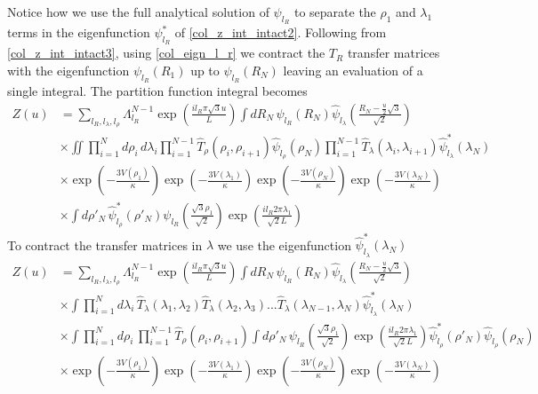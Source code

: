 %
Notice how we use the full analytical solution of $\psi_{l_R}$ to separate the $\rho_1$ and $\lambda_1$ terms in the eigenfunction $\psi^{*}_{l_R}$ of \eqref{col_z_int_intact2}. Following from \eqref{col_z_int_intact3}, using \eqref{col_eign_l_r} we contract the $T_R$ transfer matrices with the eigenfunction $\psi_{l_R}\left(R_{1}\right)$ up to $\psi_{l_R}\left(R_{N}\right)$ leaving an evaluation of a single integral. The partition function integral becomes
%
\begin{align}\label{col_z_int_intact4}
Z\left(u\right)&=\sum_{l_R,l_\lambda,l_\rho}\Lambda_{l_R}^{N-1}\exp\left(\frac{il_{R}\pi \sqrt{3}u}{L}\right)\int dR_N\,\psi_{l_R}\left(R_{N}\right)\hat{\psi}_{l_\lambda}\left(\frac{R_N-\frac{u}{2}\sqrt{3}}{\sqrt{2}}\right)\nonumber\\
&\times\iint\prod^{N}_{i=1}d\rho_i\,d\lambda_i\prod^{N-1}_{i=1}\hat{T}_{\rho}(\rho_i,\rho_{i+1})\hat{\psi}_{l_\rho}\left(\rho_{N}\right)\prod^{N-1}_{i=1}\hat{T}_{\lambda}(\lambda_i,\lambda_{i+1})\hat{\psi}^{*}_{l_\lambda}\left(\lambda_{N}\right)\nonumber\\
&\times\exp\left(-\frac{3V(\rho_{1})}{\kappa}\right)\exp\left(-\frac{3V(\lambda_{1})}{\kappa}\right)\exp\left(-\frac{3V(\rho_{N})}{\kappa}\right)\exp\left(-\frac{3V(\lambda_{N})}{\kappa}\right)\nonumber\\
&\times\int d\rho'_N\,\hat{\psi}^{*}_{l_\rho}\left(\rho'_{N}\right)\psi_{l_R}\left( \frac{\sqrt{3}\rho_1}{\sqrt{2}}\right)\exp\left(\frac{il_{R}2\pi\lambda_1}{\sqrt{2}L} \right)
\end{align}
%
To contract the transfer matrices in $\lambda$ we use the eigenfunction $\hat{\psi}^{*}_{l_\lambda}\left(\lambda_{N}\right)$
%
\begin{align}\label{col_z_int_intact5}
Z\left(u\right)&=\sum_{l_R,l_\lambda,l_\rho}\Lambda_{l_R}^{N-1}\exp\left(\frac{il_{R}\pi \sqrt{3}u}{L}\right)\int dR_N\,\psi_{l_R}\left(R_{N}\right)\hat{\psi}_{l_\lambda}\left(\frac{R_N-\frac{u}{2}\sqrt{3}}{\sqrt{2}}\right)\nonumber\\
&\times\int\prod^{N}_{i=1}d\lambda_i\, \hat{T}_{\lambda}\left(\lambda_1,\lambda_2\right)\hat{T}_{\lambda}\left(\lambda_2,\lambda_3\right)...\hat{T}_{\lambda}\left(\lambda_{N-1},\lambda_N\right)\hat{\psi}^{*}_{l_\lambda}\left(\lambda_{N}\right)\nonumber\\
&\times\int\prod^{N}_{i=1}d\rho_i\,\prod^{N-1}_{i=1}\hat{T}_{\rho}(\rho_i,\rho_{i+1})\int d\rho'_N\,\psi_{l_R}\left(\frac{\sqrt{3}\rho_1}{\sqrt{2}}\right)\exp\left(\frac{il_{R}2\pi\lambda_1}{\sqrt{2}L} \right)\hat{\psi}^{*}_{l_\rho}\left(\rho'_{N}\right)\hat{\psi}_{l_\rho}\left(\rho_{N}\right)\nonumber\\
&\times\exp\left(-\frac{3V(\rho_{1})}{\kappa}\right)\exp\left(-\frac{3V(\lambda_{1})}{\kappa}\right)\exp\left(-\frac{3V(\rho_{N})}{\kappa}\right)\exp\left(-\frac{3V(\lambda_{N})}{\kappa}\right)
\end{align}
